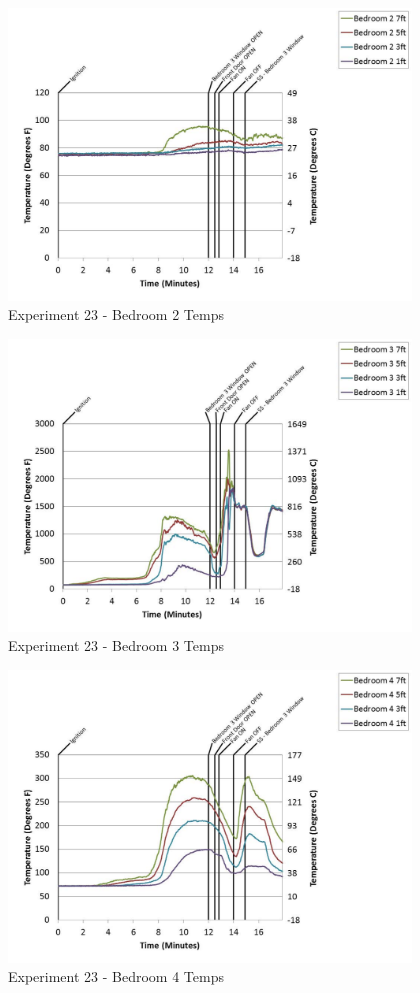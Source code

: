 \documentclass{article}
\begin{document}
\begin{appendices}
	\clearpage

	\begin{figure}[h!]
		\centering
		\includegraphics[height=3.05in]{0_Images/Results_Charts/Exp_23_Charts/Bedroom2Temps.pdf}
		\caption{Experiment 23 - Bedroom 2 Temps}
	\end{figure}
 

	\begin{figure}[h!]
		\centering
		\includegraphics[height=3.05in]{0_Images/Results_Charts/Exp_23_Charts/Bedroom3Temps.pdf}
		\caption{Experiment 23 - Bedroom 3 Temps}
	\end{figure}
 
	\clearpage

	\begin{figure}[h!]
		\centering
		\includegraphics[height=3.05in]{0_Images/Results_Charts/Exp_23_Charts/Bedroom4Temps.pdf}
		\caption{Experiment 23 - Bedroom 4 Temps}
	\end{figure}
 


\end{appendices}
\end{document}
